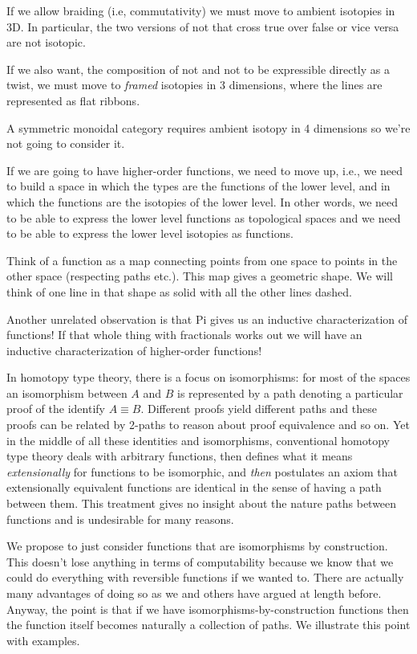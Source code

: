 \documentclass[11pt]{article}
\begin{document}
If we allow braiding (i.e, commutativity) we must move to ambient isotopies
in 3D. In particular, the two versions of not that cross true over false or
vice versa are not isotopic.

If we also want, the composition of not and not to be expressible directly as
a twist, we must move to \emph{framed} isotopies in 3 dimensions, where the
lines are represented as flat ribbons.

A symmetric monoidal category requires ambient isotopy in 4 dimensions so
we're not going to consider it.

If we are going to have higher-order functions, we need to move up, i.e., we
need to build a space in which the types are the functions of the lower
level, and in which the functions are the isotopies of the lower level. In
other words, we need to be able to express the lower level functions as
topological spaces and we need to be able to express the lower level
isotopies as functions. 

Think of a function as a map connecting points from one space to points in
the other space (respecting paths etc.). This map gives a geometric shape. We
will think of one line in that shape as solid with all the other lines dashed.

Another unrelated observation is that Pi gives us an inductive
characterization of functions! If that whole thing with fractionals
works out we will have an inductive characterization of higher-order
functions! 

In homotopy type theory, there is a focus on isomorphisms: for most of the
spaces an isomorphism between $A$ and $B$ is represented by a path denoting a
particular proof of the identify $A \equiv B$. Different proofs yield
different paths and these proofs can be related by 2-paths to reason about
proof equivalence and so on. Yet in the middle of all these identities and
isomorphisms, conventional homotopy type theory deals with arbitrary
functions, then defines what it means \emph{extensionally} for functions to
be isomorphic, and \emph{then} postulates an axiom that extensionally
equivalent functions are identical in the sense of having a path between
them. This treatment gives no insight about the nature paths between
functions and is undesirable for many reasons. 

We propose to just consider functions that are isomorphisms by
construction. This doesn't lose anything in terms of computability because we
know that we could do everything with reversible functions if we wanted
to. There are actually many advantages of doing so as we and others have
argued at length before. Anyway, the point is that if we have
isomorphisms-by-construction functions then the function itself becomes
naturally a collection of paths. We illustrate this point with examples.
\end{document}
